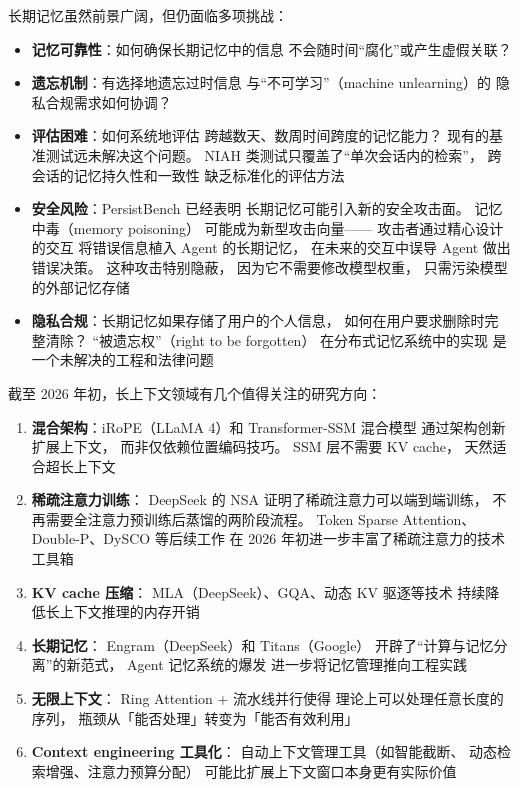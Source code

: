 \begin{warnbox}[长期记忆的开放问题]
长期记忆虽然前景广阔，但仍面临多项挑战：
\begin{itemize}[noitemsep]
  \item \textbf{记忆可靠性}：如何确保长期记忆中的信息
        不会随时间“腐化”或产生虚假关联？
  \item \textbf{遗忘机制}：有选择地遗忘过时信息
        与“不可学习”（machine unlearning）的
        隐私合规需求如何协调？
  \item \textbf{评估困难}：如何系统地评估
        跨越数天、数周时间跨度的记忆能力？
        现有的基准测试远未解决这个问题。
        NIAH 类测试只覆盖了“单次会话内的检索”，
        跨会话的记忆持久性和一致性
        缺乏标准化的评估方法
  \item \textbf{安全风险}：PersistBench 已经表明
        长期记忆可能引入新的安全攻击面。
        记忆中毒（memory poisoning）
        可能成为新型攻击向量——
        攻击者通过精心设计的交互
        将错误信息植入 Agent 的长期记忆，
        在未来的交互中误导 Agent 做出错误决策。
        这种攻击特别隐蔽，
        因为它不需要修改模型权重，
        只需污染模型的外部记忆存储
  \item \textbf{隐私合规}：长期记忆如果存储了用户的个人信息，
        如何在用户要求删除时完整清除？
        “被遗忘权”（right to be forgotten）
        在分布式记忆系统中的实现
        是一个未解决的工程和法律问题
\end{itemize}
\end{warnbox}

\begin{corebox}[长上下文的未来方向]
截至 2026 年初，长上下文领域有几个值得关注的研究方向：
\begin{enumerate}[noitemsep]
  \item \textbf{混合架构}：iRoPE（LLaMA 4）和 Transformer-SSM 混合模型
        通过架构创新扩展上下文，
        而非仅依赖位置编码技巧。
        SSM 层不需要 KV cache，
        天然适合超长上下文
  \item \textbf{稀疏注意力训练}：
        DeepSeek 的 NSA 证明了稀疏注意力可以端到端训练，
        不再需要全注意力预训练后蒸馏的两阶段流程。
        Token Sparse Attention、Double-P、DySCO 等后续工作
        在 2026 年初进一步丰富了稀疏注意力的技术工具箱
  \item \textbf{KV cache 压缩}：
        MLA（DeepSeek）、GQA、动态 KV 驱逐等技术
        持续降低长上下文推理的内存开销
  \item \textbf{长期记忆}：
        Engram（DeepSeek）和 Titans（Google）
        开辟了“计算与记忆分离”的新范式，
        Agent 记忆系统的爆发
        进一步将记忆管理推向工程实践
  \item \textbf{无限上下文}：
        Ring Attention + 流水线并行使得
        理论上可以处理任意长度的序列，
        瓶颈从「能否处理」转变为「能否有效利用」
  \item \textbf{Context engineering 工具化}：
        自动上下文管理工具（如智能截断、
        动态检索增强、注意力预算分配）
        可能比扩展上下文窗口本身更有实际价值
\end{enumerate}
\end{corebox}


